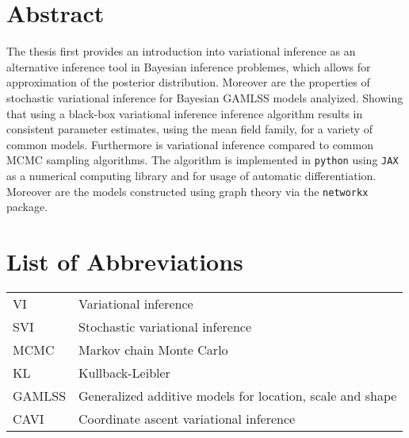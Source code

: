 \clearpage
{}


\section*{Abstract}

The thesis first provides an introduction into variational inference as an alternative
inference tool in Bayesian inference problemes, which allows for approximation of the posterior distribution.
Moreover are the properties of stochastic variational inference for Bayesian GAMLSS models analyized.
Showing that using a black-box variational inference inference algorithm results in
consistent parameter estimates, using the mean field family, for a variety of common models.
Furthermore is variational inference compared to common MCMC sampling algorithms. The algorithm is implemented in \verb|python|
using \verb|JAX| as a numerical computing library and for usage of automatic differentiation.
Moreover are the models constructed using graph theory via the \verb|networkx| package.

\clearpage

\tableofcontents
\clearpage

\listoffigures

\listoftables

\section*{List of Abbreviations}

\begin{tabular}{@{} l @{\hskip 1in} l}
  VI & Variational inference \\
  SVI & Stochastic variational inference \\
  MCMC & Markov chain Monte Carlo \\
  KL & Kullback-Leibler \\
  GAMLSS & Generalized additive models for location, scale and shape \\
  CAVI & Coordinate ascent variational inference \\
\end{tabular}
